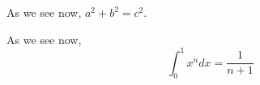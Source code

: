 

\begin{theorem}
\label{foo}
As we see now, $a^2 + b^2 = c^2$.
\end{theorem}

\begin{theorem}
\label{bar}
As we see now,
\[
  \int_0^1 x^n dx = \frac{1}{n+1}
\]
\end{theorem}






